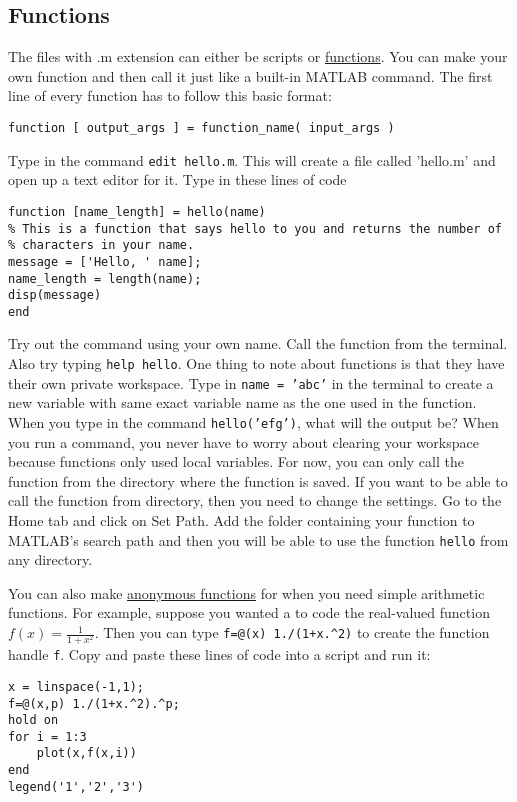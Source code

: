 \documentclass{article}
\begin{document}
\subsection{Functions}
The files with .m extension can either be scripts or \href{https://www.mathworks.com/help/matlab/ref/function.html}{functions}. You can make your own function and then call it just like a built-in MATLAB command. The first line of every function has to follow this basic format: \begin{verbatim}
function [ output_args ] = function_name( input_args )
\end{verbatim}
Type in the command \texttt{edit hello.m}. This will create a file called 'hello.m' and open up a text editor for it. Type in these lines of code
\begin{verbatim}
function [name_length] = hello(name)
% This is a function that says hello to you and returns the number of
% characters in your name.
message = ['Hello, ' name];
name_length = length(name);
disp(message)
end
\end{verbatim}
Try out the command using your own name. Call the function from the terminal. Also try typing \texttt{help hello}. One thing to note about functions is that they have their own private workspace. Type in \texttt{name = 'abc'} in the terminal to create a new variable with same exact variable name as the one used in the function. When you type in the command \texttt{hello('efg')}, what will the output be? When you run a command, you never have to worry about clearing your workspace because functions only used local variables. For now, you can only call the function from the directory where the function is saved. If you want to be able to call the function from directory, then you need to change the settings. Go to the Home tab and click on Set Path. Add the folder containing your function to MATLAB's search path and then you will be able to use the function \texttt{hello} from any directory.

You can also make \href{https://www.mathworks.com/help/matlab/matlab_prog/anonymous-functions.html}{anonymous functions} for when you need simple arithmetic functions. For example, suppose you wanted a to code the real-valued function $f(x)=\frac{1}{1+x^2}$. Then you can type \texttt{f=@(x) 1./(1+x.\^{}2)} to create the function handle \texttt{f}. Copy and paste these lines of code into a script and run it:
\begin{verbatim}
x = linspace(-1,1);
f=@(x,p) 1./(1+x.^2).^p;
hold on
for i = 1:3
    plot(x,f(x,i))
end
legend('1','2','3')
\end{verbatim}
\end{document}
